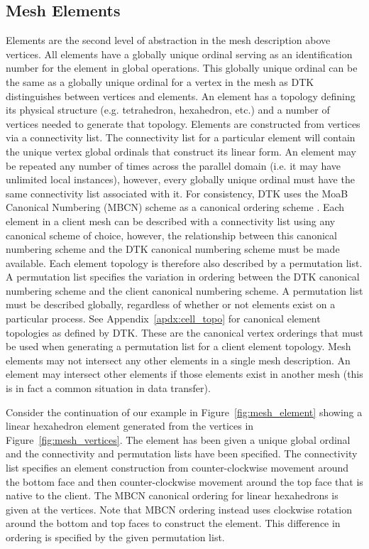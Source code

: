 \documentclass[letterpaper,12pt]{article}
\begin{document}
\subsection{Mesh Elements}\label{subsec:elements}
Elements are the second level of abstraction in the mesh description
above vertices. All elements have a globally unique ordinal serving as
an identification number for the element in global operations. This
globally unique ordinal can be the same as a globally unique ordinal
for a vertex in the mesh as DTK distinguishes between vertices and
elements. An element has a topology defining its physical structure
(e.g. tetrahedron, hexahedron, etc.) and a number of vertices needed
to generate that topology. Elements are constructed from vertices via
a connectivity list. The connectivity list for a particular element
will contain the unique vertex global ordinals that construct its
linear form. An element may be repeated any number of times across the
parallel domain (i.e. it may have unlimited local instances), however,
every globally unique ordinal must have the same connectivity list
associated with it. For consistency, DTK uses the MoaB Canonical
Numbering (MBCN) scheme as a canonical ordering scheme
\cite{Tautges_2009}. Each element in a client mesh can be described
with a connectivity list using any canonical scheme of choice,
however, the relationship between this canonical numbering scheme and
the DTK canonical numbering scheme must be made available. Each
element topology is therefore also described by a permutation list. A
permutation list specifies the variation in ordering between the DTK
canonical numbering scheme and the client canonical numbering
scheme. A permutation list must be described globally, regardless of
whether or not elements exist on a particular process. See
Appendix~\ref{apdx:cell_topo} for canonical element topologies as
defined by DTK. These are the canonical vertex orderings that must be
used when generating a permutation list for a client element
topology. Mesh elements may not intersect any other elements in a
single mesh description. An element may intersect other elements if
those elements exist in another mesh (this is in fact a common
situation in data transfer).

Consider the continuation of our example in
Figure~\ref{fig:mesh_element} showing a linear hexahedron element
generated from the vertices in Figure~\ref{fig:mesh_vertices}. The
element has been given a unique global ordinal and the connectivity
and permutation lists have been specified. The connectivity list
specifies an element construction from counter-clockwise movement
around the bottom face and then counter-clockwise movement around the
top face that is native to the client. The MBCN canonical ordering for
linear hexahedrons is given at the vertices. Note that MBCN ordering
instead uses clockwise rotation around the bottom and top faces to
construct the element. This difference in ordering is specified by the
given permutation list.
\end{document}
